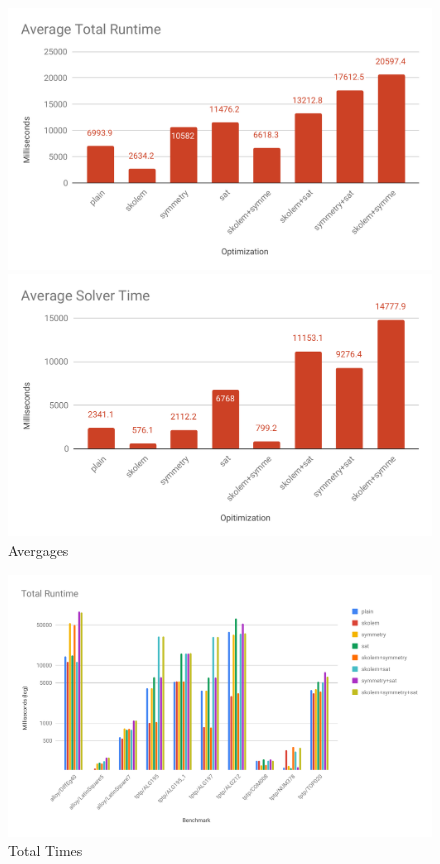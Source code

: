 \documentclass[10pt]{article}
\theoremstyle{definition}
\begin{document}
    \begin{figure}[h]
      \centering
      \begin{minipage}{.5\textwidth}
        \centering
        \includegraphics[width=\textwidth]{avg_total.pdf}   
      \end{minipage}\hfill
      \begin{minipage}{.5\textwidth}
        \centering
        \includegraphics[width=\textwidth]{avg_solver.pdf}   
      \end{minipage}
      \caption{Avergages}
      \label{fig:averages}
    \end{figure}

    \begin{figure}[h]
      \includegraphics[width=\textwidth]{total.pdf}
      \caption{Total Times}
      \label{fig:total}
    \end{figure}
\end{document}
